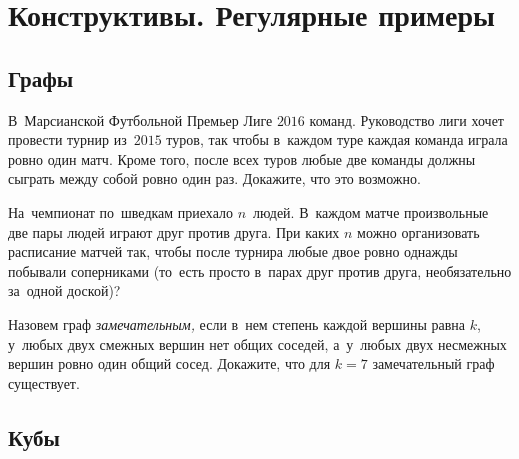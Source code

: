 
\section*{Конструктивы. Регулярные примеры}


\subsection*{Графы}

\begin{problems}

\item
В~Марсианской Футбольной Премьер Лиге $2016$ команд.
Руководство лиги хочет провести турнир из~$2015$ туров, так чтобы в~каждом туре
каждая команда играла ровно один матч.
Кроме того, после всех туров любые две команды должны сыграть между собой ровно
один раз.
Докажите, что это возможно.

\item
На~чемпионат по~шведкам приехало $n$~людей.
В~каждом матче произвольные две пары людей играют друг против друга.
При каких $n$ можно организовать расписание матчей так, чтобы после турнира
любые двое ровно однажды побывали соперниками
(то~есть просто в~парах друг против друга, необязательно за~одной доской)?

\itemx{*}
Назовем граф \emph{замечательным,} если в~нем степень каждой вершины равна $k$,
у~любых двух смежных вершин нет общих соседей, а~у~любых двух несмежных вершин
ровно один общий сосед.
Докажите, что для $k = 7$ замечательный граф существует.

\end{problems}

\subsection*{Кубы}


